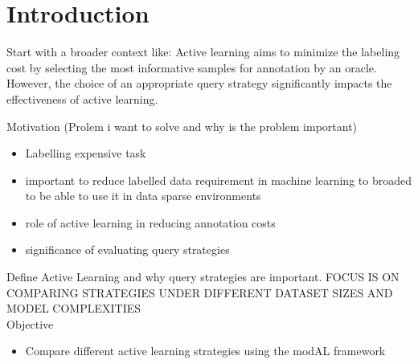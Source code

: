 \documentclass{article}
\theoremstyle{plain}
\theoremstyle{definition}
\theoremstyle{remark}
\begin{document}
\section{Introduction}\label{sec:intro}
Start with a broader context like: Active learning aims to minimize the labeling cost by selecting the most informative samples for annotation by an oracle. However, the choice of an appropriate query strategy significantly impacts the effectiveness of active learning.

Motivation (Prolem i want to solve and why is the problem important)
\begin{itemize}
	\item Labelling expensive task
	\item important to reduce labelled data requirement in machine learning to broaded to be able to use it in data sparse environments
	\item role of  active learning in reducing annotation costs
	\item significance of evaluating query strategies
\end{itemize}
Define Active Learning and why query strategies are important. FOCUS IS ON COMPARING STRATEGIES UNDER DIFFERENT DATASET SIZES AND MODEL COMPLEXITIES\\ 
Objective
\begin{itemize}
	\item Compare different active learning strategies using the modAL framework
\end{itemize}
\end{document}
